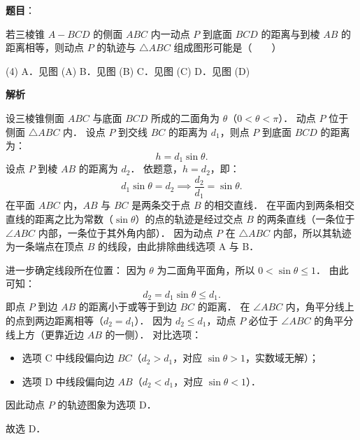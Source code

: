 \begin{answer}

\textbf{题目}：

若三棱锥 $A - BCD$ 的侧面 $ABC$ 内一动点 $P$ 到底面 $BCD$ 的距离与到棱 $AB$ 的距离相等，则动点 $P$ 的轨迹与 $\triangle ABC$ 组成图形可能是\mbox{（　　）}
\nopagebreak[4]
\begin{center}\end{center}
\nopagebreak[4]
\begin{gkopts}(4)
\task A．见图 (A)
\task B．见图 (B)
\task C．见图 (C)
\task D．见图 (D)
\end{gkopts}

\textbf{解析}
\nopagebreak[4]
\begin{center}\end{center}
\nopagebreak[4]
设三棱锥侧面 $ABC$ 与底面 $BCD$ 所成的二面角为 $\theta$（$0 < \theta < \pi$）．
动点 $P$ 位于侧面 $\triangle ABC$ 内．
设点 $P$ 到交线 $BC$ 的距离为 $d_1$，则点 $P$ 到底面 $BCD$ 的距离为：
\nopagebreak[4]
\[
h = d_1 \sin\theta.
\]
设点 $P$ 到棱 $AB$ 的距离为 $d_2$．
依题意，$h = d_2$，即：
\nopagebreak[4]
\[
d_1 \sin\theta = d_2 \implies \frac{d_2}{d_1} = \sin\theta.
\]
在平面 $ABC$ 内，$AB$ 与 $BC$ 是两条交于点 $B$ 的相交直线．
在平面内到两条相交直线的距离之比为常数（$\sin\theta$）的点的轨迹是经过交点 $B$ 的两条直线（一条位于 $\angle ABC$ 内部，一条位于其外角内部）．
因为动点 $P$ 在 $\triangle ABC$ 内部，所以其轨迹为一条端点在顶点 $B$ 的线段，由此排除曲线选项 A 与 B．

进一步确定线段所在位置：
因为 $\theta$ 为二面角平面角，所以 $0 < \sin\theta \leqslant 1$．
由此可知：
\nopagebreak[4]
\[
d_2 = d_1 \sin\theta \leqslant d_1.
\]
即点 $P$ 到边 $AB$ 的距离小于或等于到边 $BC$ 的距离．
在 $\angle ABC$ 内，角平分线上的点到两边距离相等（$d_2 = d_1$）．
因为 $d_2 \leqslant d_1$，动点 $P$ 必位于 $\angle ABC$ 的角平分线上方（更靠近边 $AB$ 的一侧）．
对比选项：
\begin{itemize}
\item 选项 C 中线段偏向边 $BC$（$d_2 > d_1$，对应 $\sin\theta > 1$，实数域无解）；
\item 选项 D 中线段偏向边 $AB$（$d_2 < d_1$，对应 $\sin\theta < 1$）．
\end{itemize}

因此动点 $P$ 的轨迹图象为选项 D．

故选 D．


\end{answer}
